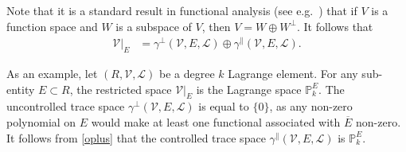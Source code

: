 \documentclass[sn-mathphys-num]{sn-jnl}%
\theoremstyle{thmstyleone}%
\newcommand{\closure}[1]{\overline{#1}}
\newcommand{\subentity}{E}
\newcommand{\refel}{R}
\newcommand{\polyspace}{\mathcal{V}}
\newcommand{\dualbasis}{\mathcal{L}}
\newcommand{\unctrace}[3]{\gamma^\perp(#1,#2,#3)}
\newcommand{\ctrace}[3]{\gamma^\parallel(#1,#2,#3)}
\theoremstyle{thmstyletwo}%
\theoremstyle{thmstylethree}%
\begin{document}
Note that it is a standard result in functional analysis
(see e.g.~\cite[theorem 3.3-4]{kreyszig}) that if $V$ is a function space and $W$ is a subspace of $V$, then
$V=W\oplus W^\perp$. It follows that
\begin{align}
\left.\polyspace\right|_{\subentity}
&=
\unctrace{\polyspace}{\subentity}{\dualbasis}\oplus\ctrace{\polyspace}{\subentity}{\dualbasis}.
\label{oplus}
\end{align}

As an example, let $(\refel,\polyspace,\dualbasis)$ be a degree $k$ Lagrange element.
For any sub-entity
$\subentity\subset\refel$, the restricted space
$\left.\polyspace\right|_{\subentity}$ is the Lagrange space $\mathbb{P}_k^\subentity$.
The uncontrolled trace space $\unctrace{\polyspace}{\subentity}{\dualbasis}$
is equal to $\{0\}$, as any non-zero polynomial on $\subentity$ would make at least one functional
associated with $\closure{\subentity}$ non-zero.
It follows from \cref{oplus} that 
the controlled trace space $\ctrace{\polyspace}{\subentity}{\dualbasis}$
is $\mathbb{P}_k^\subentity$.
\end{document}
